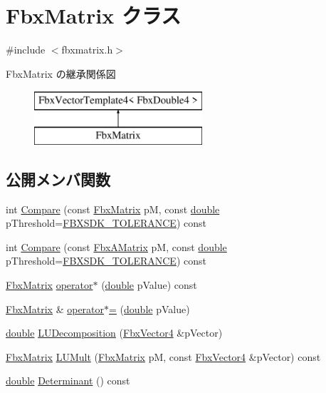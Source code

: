 \hypertarget{class_fbx_matrix}{}\section{Fbx\+Matrix クラス}
\label{class_fbx_matrix}


{\ttfamily \#include $<$fbxmatrix.\+h$>$}

Fbx\+Matrix の継承関係図\begin{figure}[H]
\begin{center}
\leavevmode
\includegraphics[height=2.000000cm]{class_fbx_matrix}
\end{center}
\end{figure}
\subsection*{公開メンバ関数}
\begin{DoxyCompactItemize}
\item 
int \hyperlink{class_fbx_matrix_a4a2be0a35135b34744cb909d98c54993}{Compare} (const \hyperlink{class_fbx_matrix}{Fbx\+Matrix} pM, const \hyperlink{class_fbx_matrix_a01f8be57393e5d9973b23897c29d5520}{double} p\+Threshold=\hyperlink{fbxtypes_8h_acf3cd6f208edb42ad9c9abbc1f7feea0}{F\+B\+X\+S\+D\+K\+\_\+\+T\+O\+L\+E\+R\+A\+N\+CE}) const
\item 
int \hyperlink{class_fbx_matrix_af70d97ac4256207042f4aeb933bfae99}{Compare} (const \hyperlink{class_fbx_a_matrix}{Fbx\+A\+Matrix} pM, const \hyperlink{class_fbx_matrix_a01f8be57393e5d9973b23897c29d5520}{double} p\+Threshold=\hyperlink{fbxtypes_8h_acf3cd6f208edb42ad9c9abbc1f7feea0}{F\+B\+X\+S\+D\+K\+\_\+\+T\+O\+L\+E\+R\+A\+N\+CE}) const
\item 
\hyperlink{class_fbx_matrix}{Fbx\+Matrix} \hyperlink{class_fbx_matrix_a456c331260776abbc6773ce327437cac}{operator$\ast$} (\hyperlink{class_fbx_matrix_a01f8be57393e5d9973b23897c29d5520}{double} p\+Value) const
\item 
\hyperlink{class_fbx_matrix}{Fbx\+Matrix} \& \hyperlink{class_fbx_matrix_a29c75e711021d29d9b046f7f0b5119cf}{operator$\ast$=} (\hyperlink{class_fbx_matrix_a01f8be57393e5d9973b23897c29d5520}{double} p\+Value)
\item 
\hyperlink{class_fbx_matrix_a01f8be57393e5d9973b23897c29d5520}{double} \hyperlink{class_fbx_matrix_a54c603f422d3a39bdf0bc6c4f3e14436}{L\+U\+Decomposition} (\hyperlink{class_fbx_vector4}{Fbx\+Vector4} \&p\+Vector)
\item 
\hyperlink{class_fbx_matrix}{Fbx\+Matrix} \hyperlink{class_fbx_matrix_ab6757b8b980b7408507a8fe95a954872}{L\+U\+Mult} (\hyperlink{class_fbx_matrix}{Fbx\+Matrix} pM, const \hyperlink{class_fbx_vector4}{Fbx\+Vector4} \&p\+Vector) const
\item 
\hyperlink{class_fbx_matrix_a01f8be57393e5d9973b23897c29d5520}{double} \hyperlink{class_fbx_matrix_add2807a6e072d224b95ec69f584a3600}{Determinant} () const
\end{DoxyCompactItemize}
